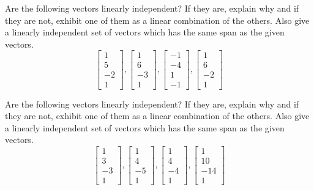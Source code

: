 \documentclass{ximera}
\begin{document}
\begin{problem}\label{prb:3.17} Are the following vectors linearly independent? If they are, explain
why and if they are not, exhibit one of them as a linear combination of the
others. Also give a linearly independent set of vectors which has the same
span as the given vectors.
\begin{equation*}
\left[
\begin{array}{r}
1 \\
5 \\
-2 \\
1
\end{array}
\right] ,\left[
\begin{array}{r}
1 \\
6 \\
-3 \\
1
\end{array}
\right] ,\left[
\begin{array}{r}
-1 \\
-4 \\
1 \\
-1
\end{array}
\right] ,\left[
\begin{array}{r}
1 \\
6 \\
-2 \\
1
\end{array}
\right]
\end{equation*}
\end{problem}


\begin{problem}\label{prb:3.20} Are the following vectors linearly independent? If they are, explain
why and if they are not, exhibit one of them as a linear combination of the
others. Also give a linearly independent set of vectors which has the same
span as the given vectors.
\begin{equation*}
\left[
\begin{array}{r}
1 \\
3 \\
-3 \\
1
\end{array}
\right] ,\left[
\begin{array}{r}
1 \\
4 \\
-5 \\
1
\end{array}
\right] ,\left[
\begin{array}{r}
1 \\
4 \\
-4 \\
1
\end{array}
\right] ,\left[
\begin{array}{r}
1 \\
10 \\
-14 \\
1
\end{array}
\right]
\end{equation*}
\end{problem}
\end{document}
